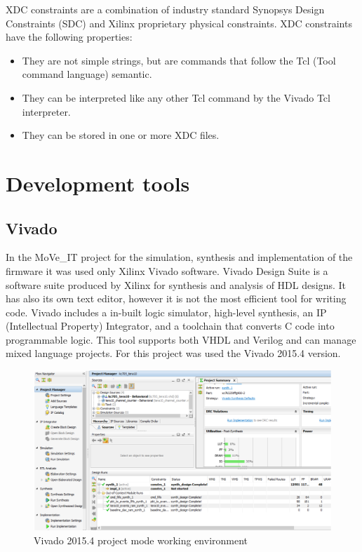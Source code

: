 \noindent XDC constraints are a combination of industry standard Synopsys Design Constraints (SDC) and Xilinx proprietary physical constraints. XDC constraints have the following properties:
\begin{itemize}
	\item They are not simple strings, but are commands that follow the Tcl (Tool command language) semantic.
	\item They can be interpreted like any other Tcl command by the Vivado Tcl interpreter.
	\item They can be stored in one or more XDC files.
\end{itemize}

\section{Development tools}

\subsection{Vivado}
\noindent In the MoVe\_IT project for the simulation, synthesis and implementation of the firmware it was used only Xilinx Vivado software.
\newline
Vivado Design Suite is a software suite produced by Xilinx for synthesis and analysis of HDL designs. It has also its own text editor, however it is not the most efficient tool for writing code.
Vivado includes a in-built logic simulator, high-level synthesis, an IP (Intellectual Property) Integrator, and a toolchain that converts C code into programmable logic\cite{vivado}.
This tool supports both VHDL and Verilog and can manage mixed language projects.
For this project was used the Vivado 2015.4 version. 
\begin{figure}[H]
	\centering
	\includegraphics[width=0.7\linewidth]{IMG/ch3/VIVADO}
	\caption{Vivado 2015.4 project mode working environment}
	\label{fig:vivado}
\end{figure}

